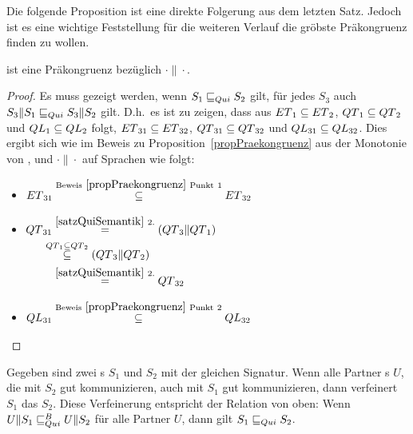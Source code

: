 Die folgende Proposition ist eine direkte Folgerung aus dem letzten Satz.
Jedoch ist es eine wichtige Feststellung für die weiteren Verlauf die gröbste
Präkongruenz finden zu wollen.

\begin{prop}[Präkongruenz]
  \label{propQuiPrae}
  \QRel{} ist eine Präkongruenz bezüglich $\cdot\|\cdot$.
\end{prop}

\begin{proof}
  Es muss gezeigt werden, wenn $S_1\sqsubseteq _{Qui} S_2$ gilt,  für   jedes $
  S_3$ auch $S_3\|S_1\sqsubseteq _{Qui} S_3\|S_2$ gilt. D.h.\ es ist zu zeigen,
  dass aus $ET{}_1\subseteq ET{}_2$, $QT{}_1\subseteq QT{}_2$ und
  $QL{}_1\subseteq QL{}_2$ folgt, $ET{}_{31}\subseteq ET{}_{32}$,
  $QT{}_{31}\subseteq QT{}_{32}$ und $QL{}_{31}\subseteq QL{}_{32}$. Dies
  ergibt sich wie im Beweis zu Proposition~\ref{propPraekongruenz} aus der
  Monotonie von \cont{}, \prune{} und $\cdot\|\cdot$ auf Sprachen wie folgt:
  \begin{itemize}
    \item $\begin{aligned}[t]
        ET{}_{31} \overset{\mathrm{Beweis}~\ref{propPraekongruenz}
        ~\mathrm{Punkt}~1}{\subseteq} ET{}_{32}
    \end{aligned}$
    \item $\begin{aligned}[t]
        \QT{}_{31} &\overset{\ref{satzQuiSemantik}~2.}{=} (\QT{}_3\|\QT{}_1)\\
                &\hspace{-0.3cm}\overset{\QT{}_1\subseteq \QT{}_2}{\subseteq} (\QT{}_3\|\QT{}_2)\\
                &\overset{\ref{satzQuiSemantik}~2.}{=} \QT{}_{32}
    \end{aligned}$
    \item $\begin{aligned}[t]
        QL{}_{31} \overset{\mathrm{Beweis}~\ref{propPraekongruenz}
        ~\mathrm{Punkt}~2}{\subseteq} QL{}_{32}
    \end{aligned}$
  \end{itemize}
\end{proof}

\begin{lem}
  \label{lemQuiVerfeinerung}
  Gegeben sind zwei \EIO{}s $S_1$ und $S_2$ mit der gleichen Signatur. Wenn
  alle Partner \EIO{}s $U$, die mit $S_2$  gut kommunizieren, auch mit $S_1$
  gut kommunizieren, dann verfeinert $S_1$ das \EIO{} $S_2$. Diese Verfeinerung
  entspricht der Relation \QRel{} von oben: Wenn $U\|S_1\sqsubseteq _{Qui}^B U\|S_2$ für alle
  Partner $U$, dann gilt $S_1\sqsubseteq _{Qui} S_2$.
\end{lem}


